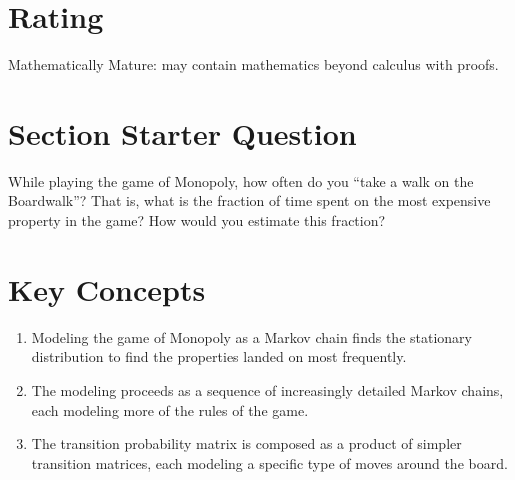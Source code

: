 \documentclass[12pt]{article}
\begin{document}
\myheader \mytitle

\hr


\hr

\usefirefox

\hr



\section*{Rating} %
Mathematically Mature:  may contain mathematics beyond calculus with
proofs. %

\hr

\section*{Section Starter Question}

While playing the game of Monopoly, how often do you ``take a walk on
the Boardwalk''?  That is, what is the fraction of time spent on the
most expensive property in the game?  How would you estimate this
fraction?

\hr

\section*{Key Concepts}

\begin{enumerate}
    \item
        Modeling the game of Monopoly as a Markov chain finds the
        stationary distribution to find the properties landed on most
        frequently.
    \item
        The modeling proceeds as a sequence of increasingly detailed
        Markov chains, each modeling more of the rules of the game.
    \item
        The transition probability matrix is composed as a product of
        simpler transition matrices, each modeling a specific type of
        moves around the board.
\end{enumerate}
\end{document}
